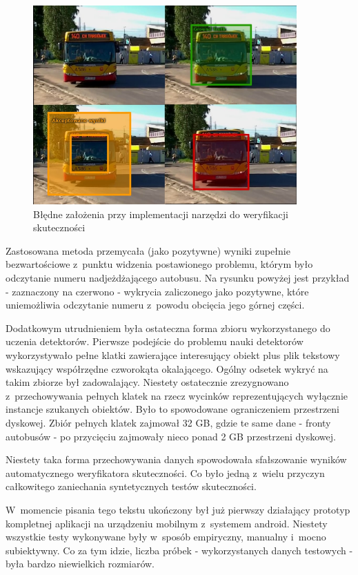 \begin{figure}[h!]
    \caption{Błędne założenia przy implementacji narzędzi do
    weryfikacji skuteczności}
    \centering
    \includegraphics[width=0.9\textwidth]{img/env_benchmark_fail_1}
\end{figure}

Zastosowana metoda przemycała (jako pozytywne) wyniki zupełnie
bezwartościowe z~punktu widzenia postawionego problemu, którym było
odczytanie numeru nadjeżdżającego autobusu. Na rysunku 
powyżej jest przykład - zaznaczony na czerwono - wykrycia zaliczonego
jako pozytywne, które uniemożliwia odczytanie numeru z~powodu obcięcia
jego górnej części.

Dodatkowym utrudnieniem była ostateczna forma zbioru wykorzystanego 
do uczenia detektorów. Pierwsze podejście do problemu nauki 
detektorów wykorzystywało pełne klatki zawierające interesujący obiekt
plus plik tekstowy wskazujący współrzędne czworokąta okalającego.
Ogólny odsetek wykryć na takim zbiorze był zadowalający. Niestety
ostatecznie zrezygnowano z~przechowywania pełnych klatek na rzecz
wycinków reprezentujących wyłącznie instancje szukanych obiektów.
Było to spowodowane ograniczeniem przestrzeni dyskowej. Zbiór pełnych
klatek zajmował 32 GB, gdzie te same dane - fronty autobusów - po
przycięciu zajmowały nieco ponad 2 GB przestrzeni dyskowej.

Niestety taka forma przechowywania danych spowodowała sfałszowanie 
wyników automatycznego weryfikatora skuteczności. Co było jedną
z~wielu przyczyn całkowitego zaniechania syntetycznych testów skuteczności.

W~momencie pisania tego tekstu ukończony był już pierwszy
działający prototyp kompletnej aplikacji na urządzeniu mobilnym
z~systemem android. Niestety wszystkie testy wykonywane były
w~sposób empiryczny, manualny i~mocno subiektywny. Co za tym idzie,
liczba próbek - wykorzystanych danych testowych - była bardzo niewielkich
rozmiarów.
